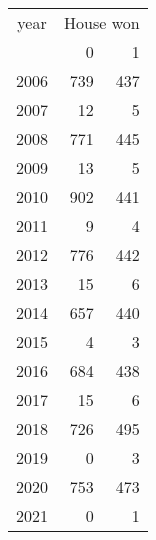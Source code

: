 \footnotesize\begin{tabular}[t]{lrr}
\toprule
\multicolumn{1}{c}{year} & \multicolumn{2}{c}{House won} \\
\cmidrule(l{3pt}r{3pt}){1-1} \cmidrule(l{3pt}r{3pt}){2-3}
  & 0 & 1\\
\midrule
2006 & 739 & 437\\
2007 & 12 & 5\\
2008 & 771 & 445\\
2009 & 13 & 5\\
2010 & 902 & 441\\
2011 & 9 & 4\\
2012 & 776 & 442\\
2013 & 15 & 6\\
2014 & 657 & 440\\
2015 & 4 & 3\\
2016 & 684 & 438\\
2017 & 15 & 6\\
2018 & 726 & 495\\
2019 & 0 & 3\\
2020 & 753 & 473\\
2021 & 0 & 1\\
\bottomrule
\end{tabular}
